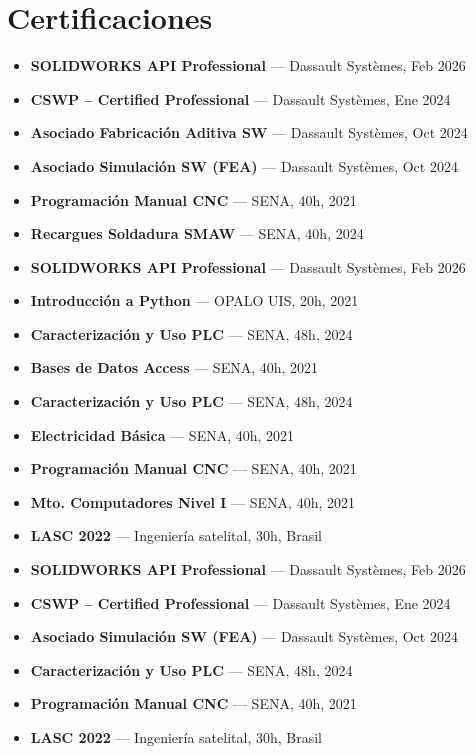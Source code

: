 \documentclass{twentysecondcv}
\begin{document}
\section{Certificaciones}

\begin{itemize}[nosep,leftmargin=*]

\ifProfileA
  \item \textbf{SOLIDWORKS API Professional} — Dassault Systèmes, Feb 2026
  \item \textbf{CSWP -- Certified Professional} — Dassault Systèmes, Ene 2024
  \item \textbf{Asociado Fabricación Aditiva SW} — Dassault Systèmes, Oct 2024
  \item \textbf{Asociado Simulación SW (FEA)} — Dassault Systèmes, Oct 2024
  \item \textbf{Programación Manual CNC} — SENA, 40h, 2021
  \item \textbf{Recargues Soldadura SMAW} — SENA, 40h, 2024
\fi

\ifProfileB
  \item \textbf{SOLIDWORKS API Professional} — Dassault Systèmes, Feb 2026
  \item \textbf{Introducción a Python} — OPALO UIS, 20h, 2021
  \item \textbf{Caracterización y Uso PLC} — SENA, 48h, 2024
  \item \textbf{Bases de Datos Access} — SENA, 40h, 2021
\fi

\ifProfileC
  \item \textbf{Caracterización y Uso PLC} — SENA, 48h, 2024
  \item \textbf{Electricidad Básica} — SENA, 40h, 2021
  \item \textbf{Programación Manual CNC} — SENA, 40h, 2021
  \item \textbf{Mto. Computadores Nivel I} — SENA, 40h, 2021
  \item \textbf{LASC 2022} — Ingeniería satelital, 30h, Brasil
\fi

\ifProfileD
  \item \textbf{SOLIDWORKS API Professional} — Dassault Systèmes, Feb 2026
  \item \textbf{CSWP -- Certified Professional} — Dassault Systèmes, Ene 2024
  \item \textbf{Asociado Simulación SW (FEA)} — Dassault Systèmes, Oct 2024
  \item \textbf{Caracterización y Uso PLC} — SENA, 48h, 2024
  \item \textbf{Programación Manual CNC} — SENA, 40h, 2021
  \item \textbf{LASC 2022} — Ingeniería satelital, 30h, Brasil
\fi

\end{itemize}
\end{document}
